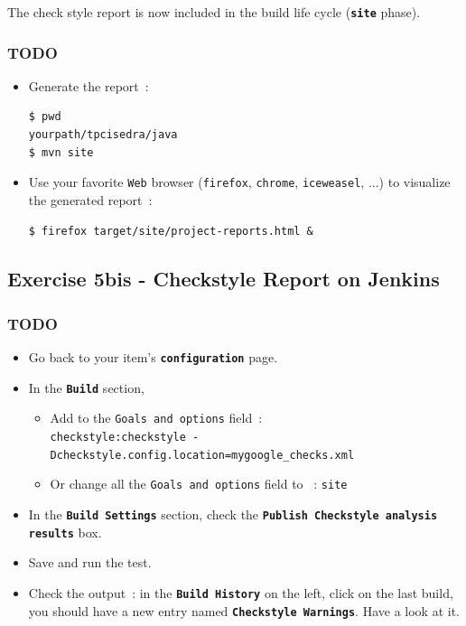 \documentclass{article}
\begin{document}
The check style report is now included in the build life cycle (\textbf{\texttt{site}} phase).

\subsubsection{TODO}

\begin {itemize}
\item Generate the report~:
\begin{lstlisting}
$ pwd
yourpath/tpcisedra/java
$ mvn site
\end{lstlisting}
\item Use your favorite \texttt{Web} browser (\texttt{firefox}, \texttt{chrome}, \texttt{iceweasel}, ...) to visualize the generated report~:
\begin{lstlisting}
$ firefox target/site/project-reports.html &
\end{lstlisting}
\end{itemize}

\subsection{Exercise 5bis - Checkstyle Report on Jenkins}

\subsubsection{TODO}
\begin{itemize}
\item Go back to your item's \textbf{\texttt{configuration}} page.
\item In the \textbf{\texttt{Build}} section, 
\begin{itemize}
\item Add to the \texttt{Goals and options} field~:\\
\texttt{checkstyle:checkstyle -Dcheckstyle.config.location=mygoogle\_checks.xml}
\item Or change all the \texttt{Goals and options} field to ~: \texttt{site}
\end{itemize}
\item In the \textbf{\texttt{Build Settings}} section, check the \textbf{\texttt{Publish Checkstyle analysis results}} box.
\item Save and run the test.
\item Check the output~: in the \textbf{\texttt{Build History}} on the left, click on the last build, you should have a new entry named \textbf{\texttt{Checkstyle Warnings}}. Have a look at it.
\end{itemize}
\end{document}
